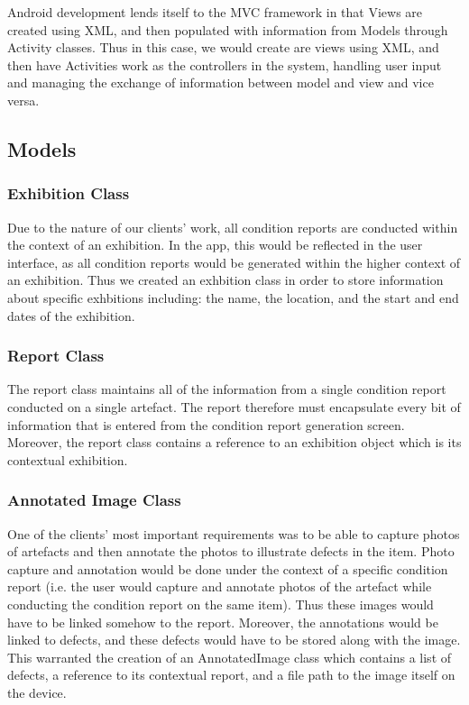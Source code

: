 \documentclass[12pt]{article}
\begin{document}
Android development lends itself to the MVC framework in that Views are created using XML, and then populated with information from Models through Activity classes. Thus in this case, we would create are views using XML, and then have Activities work as the controllers in the system, handling user input and managing the exchange of information between model and view and vice versa. 
\subsection{Models}
\subsubsection{Exhibition Class}
Due to the nature of our clients' work, all condition reports are conducted within the context of an exhibition. In the app, this would be reflected in the user interface, as all condition reports would be generated within the higher context of an exhibition. Thus we created an exhbition class in order to store information about specific exhbitions including: the name, the location, and the start and end dates of the exhibition.
\subsubsection{Report Class}
The report class maintains all of the information from a single condition report conducted on a single artefact. The report therefore must encapsulate every bit of information that is entered from the condition report generation screen. Moreover, the report class contains a reference to an exhibition object which is its contextual exhibition.
\subsubsection{Annotated Image Class}
One of the clients' most important requirements was to be able to capture photos of artefacts and then annotate the photos to illustrate defects in the item. Photo capture and annotation would be done under the context of a specific condition report (i.e. the user would capture and annotate photos of the artefact while conducting the condition report on the same item). Thus these images would have to be linked somehow to the report. Moreover, the annotations would be linked to defects, and these defects would have to be stored along with the image. This warranted the creation of an AnnotatedImage class which contains a list of defects, a reference to its contextual report, and a file path to the image itself on the device.
\end{document}
